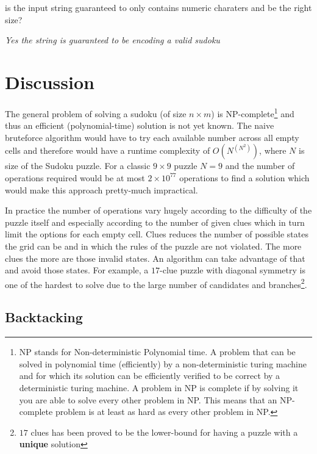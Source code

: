 \begin{QandA}
	\item is the input string guaranteed to only contains numeric charaters and be the right size?
	\begin{answered}
		\textit{Yes the string is guaranteed to be encoding a valid sudoku}
	\end{answered}	
\end{QandA}

\section{Discussion}
\label{sudoku:sec:discussion}
The general problem of solving a sudoku (of size $n\times m$) is
NP-complete\footnote{NP stands for Non-deterministic Polynomial time. A problem
that can be solved in polynomial time (efficiently) by a non-deterministic
turing machine and for which its solution can be efficiently verified to be
correct by a deterministic turing machine. A problem in NP is complete if by
solving it you are able to solve every other problem in NP. This means that an
NP-complete problem is at least as hard as every other problem in NP.} and thus
an efficient
(polynomial-time) solution is not yet known. The naive bruteforce algorithm would have to try each
available number across all empty cells and therefore would have a runtime complexity of
$O(N^{(N^2)})$, where $N$ is size of the Sudoku puzzle. For a classic  $9 \times 9$ puzzle $N = 9$ and
the number of operations required would be at most $2 \times 10^{77}$ operations to find a solution
which would make this approach pretty-much impractical. 

In practice the number of operations vary
hugely according to the difficulty of the puzzle itself and especially according to the number of
given clues which in turn limit the options for each empty cell. Clues reduces the number of
possible states the grid can be and in which the rules of the puzzle are not violated. The more
clues the more are those invalid states. An algorithm can take advantage of that and avoid those
states. For example, a $17$-clue puzzle with diagonal symmetry is one of the hardest to solve due to
the large number of candidates and branches\footnote{$17$ clues has been proved
to be the lower-bound for having a puzzle with a \textbf{unique} solution}. 

\subsection{Backtacking}
\label{sudoku:sec:bruteforce}

